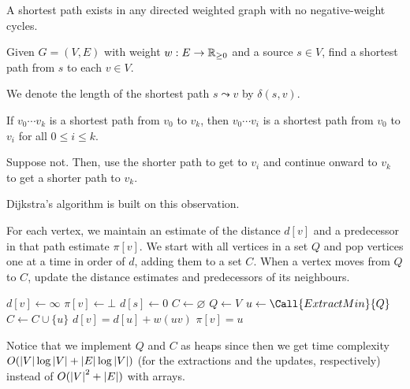 \begin{remark}
  A shortest path exists in any directed weighted graph
  with no negative-weight cycles.
\end{remark}

\begin{problem}\label{prob:g:sp}
  Given $G = (V, E)$ with weight $w : E \to \mathbb{R}_{\geq 0}$ and a source $s \in V$,
  find a shortest path from $s$ to each $v \in V$.
\end{problem}

We denote the length of the shortest path $s \leadsto v$ by $\delta(s,v)$.

\begin{remark}\label{rem:greedy:path}
  If $v_0\cdots v_k$ is a shortest path from $v_0$ to $v_k$,
  then $v_0\cdots v_i$ is a shortest path from $v_0$ to $v_i$
  for all $0 \leq i \leq k$.
\end{remark}
\begin{prf}
  Suppose not.
  Then, use the shorter path to get to $v_i$ and continue onward to $v_k$
  to get a shorter path to $v_k$.
\end{prf}

Dijkstra's algorithm is built on this observation.

For each vertex, we maintain an estimate of the distance $d[v]$
and a predecessor in that path estimate $\pi[v]$.
We start with all vertices in a set $Q$
and pop vertices one at a time in order of $d$,
adding them to a set $C$.
When a vertex moves from $Q$ to $C$,
update the distance estimates and predecessors of its neighbours.

\begin{algorithm}[H]
  \caption{}
  \begin{algorithmic}[1]
      \State $d[v] \gets \infty$
      \State $\pi[v] \gets \bot$
    \EndFor
    \State $d[s] \gets 0$
    \State $C \gets \varnothing$
    \State $Q \gets V$
      \State $u \gets \Call{ExtractMin}{Q}$
      \State $C \gets C \cup \{u\}$
          \State $d[v] = d[u] + w(uv)$
          \State $\pi[v] = u$
        \EndIf
      \EndFor
    \EndWhile
  \end{algorithmic}
\end{algorithm}

Notice that we implement $Q$ and $C$ as heaps since then
we get time complexity $O(\abs{V}\log\abs{V} + \abs{E}\log\abs{V})$
(for the extractions and the updates, respectively)
instead of $O(\abs{V}^2+\abs{E})$ with arrays.

